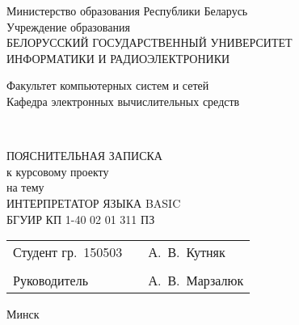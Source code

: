 %
\thispagestyle{empty}

\begin{center}
  Министерство образования Республики Беларусь\\[1em]
  Учреждение образования\\
  БЕЛОРУССКИЙ ГОСУДАРСТВЕННЫЙ УНИВЕРСИТЕТ\\
  ИНФОРМАТИКИ И РАДИОЭЛЕКТРОНИКИ\\[2em]

  \begin{minipage}{\textwidth}
    \begin{flushleft}
      Факультет компьютерных систем и сетей\\[1em]
      Кафедра электронных вычислительных средств\\[1em]
    \end{flushleft}
  \end{minipage}\\[1em]
  
  \vfill

  {ПОЯСНИТЕЛЬНАЯ ЗАПИСКА}\\
  {к курсовому проекту}\\
  {на тему}\\
  \MakeUppercase{Интерпретатор языка Basic}\\
  {БГУИР КП 1-40 02 01 311 ПЗ}\\

  \vfill

  \begin{tabular}{p{}p{}p{}}
    Студент гр.~150503     &&   А.~В.~Кутняк     \\
                            &&                    \\
    Руководитель           &&   А.~В.~Марзалюк   \\
  \end{tabular}
  
  \vfill

  {\normalsize Минск \the\year}
\end{center}